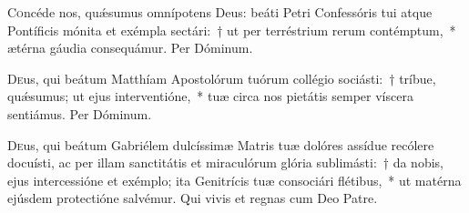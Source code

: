 \documentclass[vesperale_romanum.tex]{subfiles}
\begin{document}
\oratio

\lettrine{C}{o}ncéde nos, quǽsumus omnípotens Deus: beáti Petri Confessóris tui atque Pontíficis mónita et exémpla sectári:~† ut per terréstrium rerum contémptum,~* ætérna gáudia consequámur. Per Dóminum.

\quadcommferiae

\myrule



{}


\oratio

\lettrine{D}{e}us, qui beátum Matthíam Apostolórum tuórum collégio sociásti:~† tríbue, quǽsumus; ut ejus interventióne,~* tuæ circa nos pietátis semper víscera sentiámus.
Per Dóminum.


\quadcommferiae

\myrule



\duplex

\oratio
\lettrine{D}{e}us, qui beátum Gabriélem dulcíssimæ Matris tuæ dolóres assídue recólere docuísti, ac per illam sanctitátis et miraculórum glória sublimásti:~† da nobis, ejus intercessióne et exémplo; ita Genitrícis tuæ consociári flétibus,~* ut matérna ejúsdem protectióne salvémur.
Qui vivis et regnas cum Deo Patre.

\quadcommferiae
\end{document}
